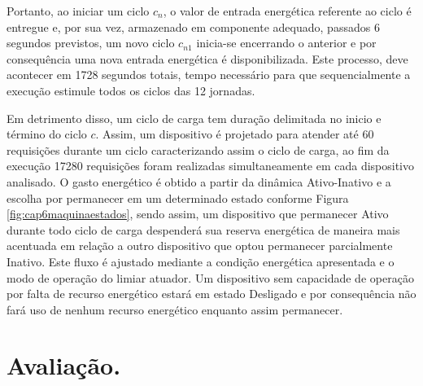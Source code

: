 Portanto, ao iniciar um ciclo $c_n$, o valor de entrada energética referente ao ciclo é entregue e, por sua vez, armazenado em componente adequado, passados 6 segundos previstos, um novo ciclo $c_{n1}$ inicia-se encerrando o anterior e por consequência uma nova entrada energética é disponibilizada. Este processo, deve acontecer em 1728 segundos totais, tempo necessário para que sequencialmente a execução estimule todos os ciclos das 12 jornadas.

Em detrimento disso, um ciclo de carga tem duração delimitada no inicio e término do ciclo $c$. Assim, um dispositivo é projetado para atender até 60 requisições durante um ciclo caracterizando assim o ciclo de carga, ao fim da execução 17280 requisições foram realizadas simultaneamente em cada dispositivo analisado. O gasto energético é obtido a partir da dinâmica Ativo-Inativo e a escolha por permanecer em um determinado estado conforme Figura \ref{fig:cap6maquinaestados}, sendo assim, um dispositivo que permanecer Ativo durante todo ciclo de carga despenderá sua reserva energética de maneira mais acentuada em relação a outro dispositivo que optou permanecer parcialmente Inativo. Este fluxo é ajustado mediante a condição energética apresentada e o modo de operação do limiar atuador. Um dispositivo sem capacidade de operação por falta de recurso energético estará em estado Desligado e por consequência não fará uso de nenhum recurso energético enquanto assim permanecer.



\section{Avaliação.}
\label{cap6:avaliacao}
 